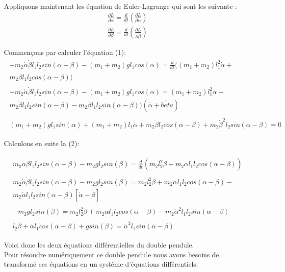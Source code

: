 \documentclass{article}
\begin{document}
Appliquons maintenant les équation de Euler-Lagrange qui sont les suivante :
\begin{align}
    \frac{\partial L}{\partial \alpha}=\frac{d}{dt}(\frac{\partial L}{\partial \dot{\alpha}})
\end{align}
\begin{align}
    \frac{\partial L}{\partial \beta}=\frac{d}{dt}(\frac{\partial L}{\partial \dot{\beta}})
\end{align}

Commençons par calculer l'équation (1):
\begin{align*}
    \begin{split}
        -m_2 \dot{\alpha}\dot{\beta}l_1l_2sin(\alpha - \beta)
        -(m_1+m_2)g l_1 cos(\alpha) = 
        \frac{d}{dt}((m_1+m_2)l_1^2\dot{\alpha}+\\
        m_2\dot{\beta}l_1l_2cos(\alpha-\beta))
    \end{split}
    \\
    \begin{split}
         -m_2 \dot{\alpha}\dot{\beta}l_1l_2sin(\alpha - \beta)
        -(m_1+m_2)g l_1 cos(\alpha) = 
        (m_1+m_2)l_1^2\ddot{\alpha}
        +\\m_2\ddot{\beta}l_1l_2sin(\alpha-\beta)-m_2\dot{\beta}l_1l_2sin(\alpha-\beta))(\dot{\alpha}+\dot{beta})
    \end{split}
    \\
    \begin{split}
        \boxed{(m_1+m_2)g l_1 sin(\alpha)+ (m_1+m_2)l_1\ddot{\alpha} +m_2\ddot{\beta}l_2cos(\alpha-\beta)
        +m_2\dot{\beta}^2l_2sin(\alpha-\beta)=0}
    \end{split}
\end{align*}

Calculons en suite la (2):

\begin{align*}
    \begin{split}
        m_2 \dot{\alpha}\dot{\beta}l_1 l_2 sin (\alpha-\beta)
        -m_2g l_2 sin(\beta)=
        \frac{d}{dt}(m_2 l_2^2 \dot{\beta}+m_2\dot{\alpha}l_1 l_2 cos(\alpha-\beta))
    \end{split}
    \\
    \begin{split}
        m_2 \dot{\alpha}\dot{\beta}l_1 l_2 sin (\alpha-\beta)
        -m_2g l_2 sin(\beta)=
        m_2 l_2^2 \ddot{\beta}+m_2\ddot{\alpha}l_1 l_2 cos(\alpha-\beta)-\\m_2\dot{\alpha}l_1 l_2 sin(\alpha-\beta)[\dot{\alpha}-\dot{\beta}]
    \end{split}
    \\
    \begin{split}
        -m_2g l_2 sin(\beta)=
        m_2 l_2^2 \ddot{\beta}+m_2\ddot{\alpha}l_1 l_2 cos(\alpha-\beta)-m_2\dot{\alpha}^2l_1 l_2 sin(\alpha-\beta)
    \end{split}
    \\
    \begin{split}
        \boxed{l_2 \ddot{\beta}+\ddot{\alpha}l_1 cos(\alpha-\beta)
        +g sin(\beta)=
        \dot{\alpha}^2l_1 sin(\alpha-\beta)}
    \end{split}
\end{align*}

Voici donc les deux équations différentielles du double pendule.\\
Pour résoudre numériquement ce double pendule nous avons besoins de transformé ces équations en un système d'équations différentiels.
\end{document}
